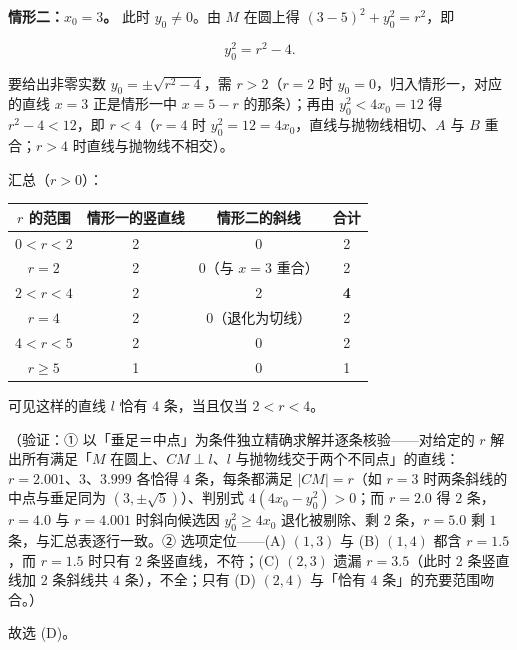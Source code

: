 \begin{answer}
\textbf{情形二：\(x_0=3\)。} 此时 \(y_0\neq0\)。由 \(M\) 在圆上得 \((3-5)^2+y_0^2=r^2\)，即

\nopagebreak[4]
\[
y_0^2=r^2-4 .
\]

要给出非零实数 \(y_0=\pm\sqrt{r^2-4}\)，需 \(r>2\)（\(r=2\) 时 \(y_0=0\)，归入情形一，对应的直线 \(x=3\) 正是情形一中 \(x=5-r\) 的那条）；再由 \(y_0^2<4x_0=12\) 得 \(r^2-4<12\)，即 \(r<4\)（\(r=4\) 时 \(y_0^2=12=4x_0\)，直线与抛物线相切、\(A\) 与 \(B\) 重合；\(r>4\) 时直线与抛物线不相交）。

汇总（\(r>0\)）：

\begin{center}
\begin{tabular}{cccc}
\toprule
\(r\) 的范围 & 情形一的竖直线 & 情形二的斜线 & 合计 \\
\midrule
\(0<r<2\) & 2 & 0 & 2 \\
\(r=2\) & 2 & 0（与 \(x=3\) 重合） & 2 \\
\(2<r<4\) & 2 & 2 & \textbf{4} \\
\(r=4\) & 2 & 0（退化为切线） & 2 \\
\(4<r<5\) & 2 & 0 & 2 \\
\(r\geqslant5\) & 1 & 0 & 1 \\
\bottomrule
\end{tabular}
\end{center}

可见这样的直线 \(l\) 恰有 \(4\) 条，当且仅当 \(2<r<4\)。

（验证：① 以「垂足＝中点」为条件独立精确求解并逐条核验——对给定的 \(r\) 解出所有满足「\(M\) 在圆上、\(CM\perp l\)、\(l\) 与抛物线交于两个不同点」的直线：\(r=2.001\)、\(3\)、\(3.999\) 各恰得 \(4\) 条，每条都满足 \(|CM|=r\)（如 \(r=3\) 时两条斜线的中点与垂足同为 \((3,\pm\sqrt{5})\)）、判别式 \(4\left(4x_0-y_0^2\right)>0\)；而 \(r=2.0\) 得 \(2\) 条，\(r=4.0\) 与 \(r=4.001\) 时斜向候选因 \(y_0^2\geqslant4x_0\) 退化被剔除、剩 \(2\) 条，\(r=5.0\) 剩 \(1\) 条，与汇总表逐行一致。② 选项定位——(A) \((1,3)\) 与 (B) \((1,4)\) 都含 \(r=1.5\)，而 \(r=1.5\) 时只有 \(2\) 条竖直线，不符；(C) \((2,3)\) 遗漏 \(r=3.5\)（此时 \(2\) 条竖直线加 \(2\) 条斜线共 \(4\) 条），不全；只有 (D) \((2,4)\) 与「恰有 \(4\) 条」的充要范围吻合。）

故选 (D)。


\end{answer}
